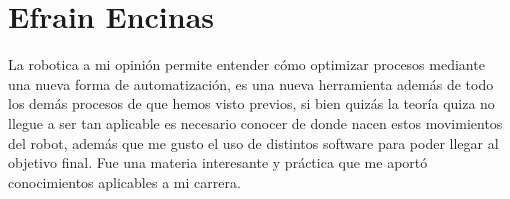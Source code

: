 \section{Efrain Encinas}
La robotica a mi opinión permite entender cómo optimizar procesos mediante una nueva forma de automatización, es una nueva herramienta además de todo los demás procesos de que hemos visto previos, si bien quizás la teoría quiza no llegue a ser tan aplicable es necesario conocer de donde nacen estos movimientos del robot, además que me gusto el uso de distintos software para poder llegar al objetivo final. Fue una materia interesante y práctica que me aportó conocimientos aplicables a mi carrera.